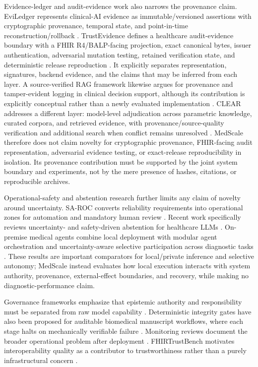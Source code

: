 Evidence-ledger and audit-evidence work also narrows the provenance claim. EviLedger represents clinical-AI evidence as immutable/versioned assertions with cryptographic provenance, temporal state, and point-in-time reconstruction/rollback \citep{LiEviLedger.2026}. TrustEvidence defines a healthcare audit-evidence boundary with a FHIR R4/BALP-facing projection, exact canonical bytes, issuer authentication, adversarial mutation testing, retained verification state, and deterministic release reproduction \citep{Clim.2026}. It explicitly separates representation, signatures, backend evidence, and the claims that may be inferred from each layer. A source-verified RAG framework likewise argues for provenance and tamper-evident logging in clinical decision support, although its contribution is explicitly conceptual rather than a newly evaluated implementation \citep{Alu.2026}. CLEAR addresses a different layer: model-level adjudication across parametric knowledge, curated corpora, and retrieved evidence, with provenance/source-quality verification and additional search when conflict remains unresolved \citep{Wang.2026}. MedScale therefore does not claim novelty for cryptographic provenance, FHIR-facing audit representation, adversarial evidence testing, or exact-release reproducibility in isolation. Its provenance contribution must be supported by the joint system boundary and experiments, not by the mere presence of hashes, citations, or reproducible archives.

Operational-safety and abstention research further limits any claim of novelty around uncertainty. SA-ROC converts reliability requirements into operational zones for automation and mandatory human review \citep{Kim.2026}. Recent work specifically reviews uncertainty- and safety-driven abstention for healthcare LLMs \citep{Presacan.2026}. On-premise medical agents combine local deployment with modular agent orchestration and uncertainty-aware selective participation across diagnostic tasks \citep{Zhang.2026}. These results are important comparators for local/private inference and selective autonomy; MedScale instead evaluates how local execution interacts with system authority, provenance, external-effect boundaries, and recovery, while making no diagnostic-performance claim.

Governance frameworks emphasize that epistemic authority and responsibility must be separated from raw model capability \citep{Akgun.2026,Cao.2026}. Deterministic integrity gates have also been proposed for auditable biomedical manuscript workflows, where each stage halts on mechanically verifiable failure \citep{Nam.2026}. Monitoring reviews document the broader operational problem after deployment \citep{Andersen.2024}. FHIRTrustBench motivates interoperability quality as a contributor to trustworthiness rather than a purely infrastructural concern \citep{Bukhari.2026}.

